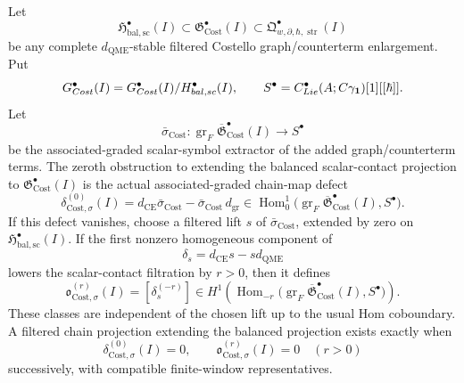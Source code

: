 \begin{thm}
\label{thm:app-costello-graph-extension-obstruction}
  Let
  \[
    \mathfrak H^\bullet_{\mathrm{bal,sc}}(I)
      \subset
    \mathfrak G^\bullet_{\mathrm{Cost}}(I)
      \subset
    \mathfrak Q^\bullet_{w,\partial,\hbar,\operatorname{str}}(I)
  \]
  be any complete \(d_{\mathrm{QME}}\)-stable filtered
  Costello graph/counterterm enlargement.  Put
  \[
    G^\bullet_{Cost}(I)
      =
    G^\bullet_{Cost}(I)/
    H^\bullet_{bal,sc}(I),
    \qquad
    S^\bullet=
    C^\bullet_{Lie}(A;C\gamma_{\mathbf 1})[1][[\hbar]].
  \]
  Let
  \[
    \bar\sigma_{\mathrm{Cost}}\colon
    \operatorname{gr}_{F}
      \overline{\mathfrak G}^\bullet_{\mathrm{Cost}}(I)
      \longrightarrow S^\bullet
  \]
  be the associated-graded scalar-symbol extractor of the added
  graph/counterterm terms.  The zeroth obstruction to extending the
  balanced scalar-contact projection to
  \(\mathfrak G^\bullet_{\mathrm{Cost}}(I)\) is the actual
  associated-graded chain-map defect
  \[
    \delta^{(0)}_{\mathrm{Cost},\sigma}(I)
      =
      d_{\mathrm{CE}}\bar\sigma_{\mathrm{Cost}}
        -
      \bar\sigma_{\mathrm{Cost}}\,d_{\operatorname{gr}}
    \in
    \operatorname{Hom}^{1}_{0}\bigl(
        \operatorname{gr}_{F}
          \overline{\mathfrak G}^\bullet_{\mathrm{Cost}}(I),
        S^\bullet
      \bigr) .
  \]
  If this defect vanishes, choose a filtered lift \(s\) of
  \(\bar\sigma_{\mathrm{Cost}}\), extended by zero on
  \(\mathfrak H^\bullet_{\mathrm{bal,sc}}(I)\).  If the first nonzero
  homogeneous component of
  \[
    \delta_s=d_{\mathrm{CE}}s-sd_{\mathrm{QME}}
  \]
  lowers the scalar-contact filtration by \(r>0\), then it defines
  \[
    \mathfrak o^{(r)}_{\mathrm{Cost},\sigma}(I)
      =
    \left[\delta_s^{(-r)}\right]
    \in
    H^1\!\left(
      \operatorname{Hom}_{-r}\bigl(
        \operatorname{gr}_{F}
          \overline{\mathfrak G}^\bullet_{\mathrm{Cost}}(I),
        S^\bullet
      \bigr)
    \right).
  \]
  These classes are independent of the chosen lift up to the usual Hom
  coboundary.  A filtered chain projection extending the balanced
  projection exists exactly when
  \[
    \delta^{(0)}_{\mathrm{Cost},\sigma}(I)=0,\qquad
    \mathfrak o^{(r)}_{\mathrm{Cost},\sigma}(I)=0
    \quad(r>0)
  \]
  successively, with compatible finite-window representatives.


\end{thm}

